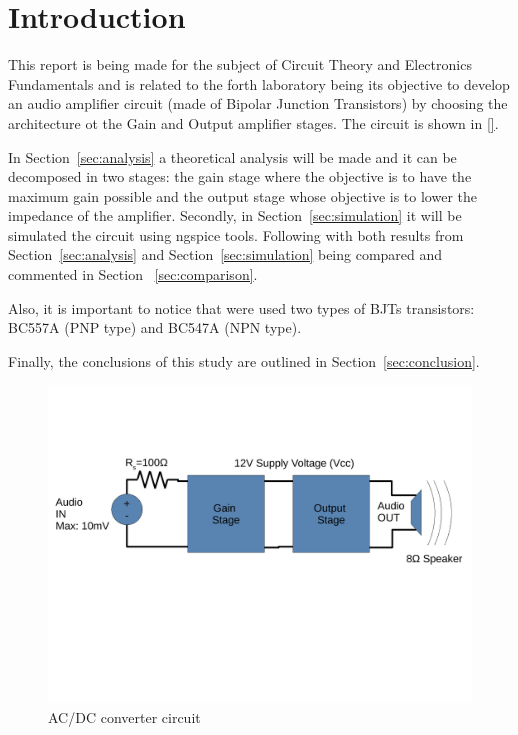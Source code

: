 \section{Introduction}
\label{sec:introduction}


\hspace{0,5cm} This report is being made for the subject of Circuit Theory and Electronics Fundamentals and is related to the forth laboratory being its objective to develop an audio amplifier circuit (made of Bipolar Junction Transistors) by choosing the architecture ot the Gain and Output amplifier stages. The circuit is shown in \ref{}.
\par In Section~\ref{sec:analysis} a theoretical analysis will be made and it can be decomposed in two stages: the gain stage where the objective is to have the maximum gain possible and the output stage whose objective is to lower the impedance of the amplifier. Secondly, in Section~\ref{sec:simulation} it will be simulated the circuit using ngspice tools. Following with both results from Section~\ref{sec:analysis} and Section~\ref{sec:simulation} being compared and commented in Section ~\ref{sec:comparison}. 
\par Also, it is important to notice that were used two types of BJTs transistors: BC557A (PNP type) and BC547A (NPN type).
\par Finally, the conclusions of this study are outlined in Section~\ref{sec:conclusion}.

\begin{figure}[H] \centering
\includegraphics[width=1\linewidth]{circuito.pdf}
\caption{AC/DC converter circuit}
\label{fig:circuito}
\end{figure}


